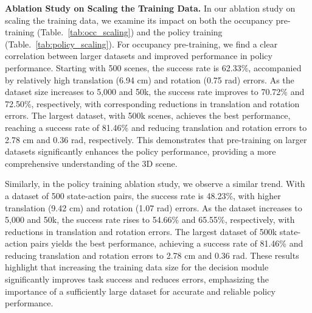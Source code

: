 \begin{table}
\centering  
{}
\caption{ Scaling the training data for policy while maintaining occupancy pre-training data size. }
\label{tab:policy_scaling}
\end{table}

\textbf{Ablation Study on Scaling the Training Data.} In our ablation study on scaling the training data, we examine its impact on both the occupancy pre-training (Table.~\ref{tab:occ_scaling}) and the policy training (Table.~\ref{tab:policy_scaling}). For occupancy pre-training, we find a clear correlation between larger datasets and improved performance in policy performance. Starting with 500 scenes, the success rate is 62.33\%, accompanied by relatively high translation (6.94 cm) and rotation (0.75 rad) errors. As the dataset size increases to 5,000 and 50k, the success rate improves to 70.72\% and 72.50\%, respectively, with corresponding reductions in translation and rotation errors. The largest dataset, with 500k scenes, achieves the best performance, reaching a success rate of 81.46\% and reducing translation and rotation errors to 2.78 cm and 0.36 rad, respectively. 
This demonstrates that pre-training on larger datasets significantly enhances the policy performance, providing a more comprehensive understanding of the 3D scene.

Similarly, in the policy training ablation study, we observe a similar trend. With a dataset of 500 state-action pairs, the success rate is 48.23\%, with higher translation (9.42 cm) and rotation (1.07 rad) errors. As the dataset increases to 5,000 and 50k, the success rate rises to 54.66\% and 65.55\%, respectively, with reductions in translation and rotation errors. The largest dataset of 500k state-action pairs yields the best performance, achieving a success rate of 81.46\% and reducing translation and rotation errors to 2.78 cm and 0.36 rad. These results highlight that increasing the training data size for the decision module significantly improves task success and reduces errors, emphasizing the importance of a sufficiently large dataset for accurate and reliable policy performance.


